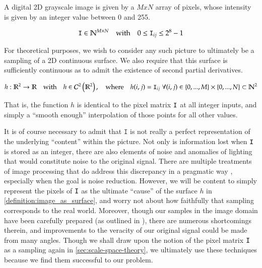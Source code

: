 
A digital 2D grayscale image is given by a $MxN$ array of pixels, whose intensity is given by an integer value between 0 and 255.

\begin{defn} \label{definition:image_as_pixel_matrix}
	\begin{equation*}
	\mathtt{I} \in \mathbb{N}^{M \times N}
	\quad\textrm{with}\quad
	0 \le \mathtt{I}_{ij} \le 2^8 - 1
	\end{equation*}
\end{defn}
	For theoretical purposes, we wish to consider any such picture to ultimately be a sampling of a 2D continuous surface. We also require that this surface is sufficiently continuous as to admit the existence of second partial derivatives.
	
\begin{defn} \label{definition:image_as_surface}
 \begin{equation*}
 h: \mathbb{R}^2 \to \mathbb{R}
 \quad \textrm{with}\quad
 h \in \mathcal{C}^2\left(\mathbb{R}^2\right),
 \quad\textrm{where}\quad
    h(i,j) = \mathtt{I}_{ij}
    \; \forall (i,j) \in
     \left\{0,...,M\right\} \times
     \left\{0,...,N\right\} \subset \mathbb{N}^2
    \end{equation*}
\end{defn}
That is, the function $h$ is identical to the pixel matrix $\mathtt{I}$ at all integer inputs,
and simply a ``smooth enough'' interpolation of those points for all other values.


It is of course necessary to admit that $\mathtt{I}$ is not really a perfect representation of the underlying ``content'' within the picture. Not only is information lost when $\mathtt{I}$ is stored as an integer, there are also elements of noise and anomalies of lighting that would constitute noise to the original signal. There are multiple treatments of image processing that do address this discrepancy in a pragmatic way \cite{DIPGW}, especially when the goal is noise reduction. However, we will be content to simply represent the pixels of $\mathtt{I}$ as the ultimate ``cause'' of the surface $h$ in \cref{definition:image_as_surface}, and worry not about how faithfully that sampling corresponds to the real world.
Moreover, though our samples in the image domain have been carefully prepared (as outlined in \label{sec:NCS-data-set}), there are numerous shortcomings therein, and improvements to the veracity of our original signal could be made from many angles.
Though we shall draw upon the notion of the pixel matrix $\mathtt{I}$ as a sampling again in \cref{sec:scale-space-theory}, we ultimately use these techniques because we find them successful to our problem.
 

